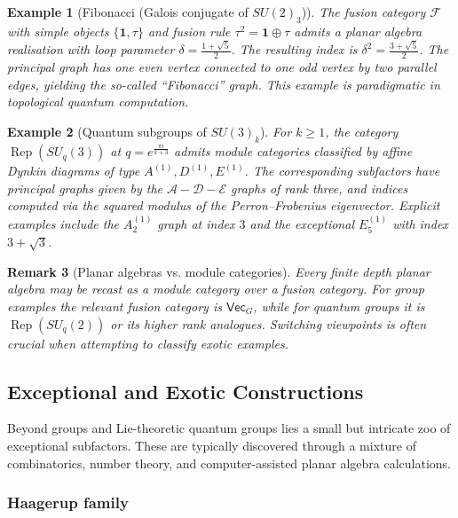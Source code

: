 \documentclass[11pt, a4paper]{article}
\theoremstyle{colored_def}
\theoremstyle{colored_thm}
\theoremstyle{colored_ex}
\newtheorem{example}{Example}[section]
\newtheorem{remark}[example]{Remark}
\begin{document}
\begin{example}[Fibonacci (Galois conjugate of $SU(2)_3$)]\label{ex:fibonacci}
The fusion category $\mathcal{F}$ with simple objects $\{\mathbf{1}, \tau\}$ and fusion rule $\tau^2 = \mathbf{1} \oplus \tau$ admits a planar algebra realisation with loop parameter $\delta = \frac{1 + \sqrt{5}}{2}$. The resulting index is $\delta^2 = \frac{3 + \sqrt{5}}{2}$. The principal graph has one even vertex connected to one odd vertex by two parallel edges, yielding the so-called ``Fibonacci'' graph. This example is paradigmatic in topological quantum computation.
\end{example}

\begin{example}[Quantum subgroups of $SU(3)_k$]\label{ex:su3}
For $k \geq 1$, the category $\operatorname{Rep}(SU_q(3))$ at $q = e^{\frac{\pi i}{k+3}}$ admits module categories classified by affine Dynkin diagrams of type $A^{(1)}, D^{(1)}, E^{(1)}$. The corresponding subfactors have principal graphs given by the $\mathcal{A}-\mathcal{D}-\mathcal{E}$ graphs of rank three, and indices computed via the squared modulus of the Perron--Frobenius eigenvector. Explicit examples include the $A^{(1)}_2$ graph at index $3$ and the exceptional $E^{(1)}_5$ with index $3 + \sqrt{3}$.
\end{example}

\begin{remark}[Planar algebras vs. module categories]
Every finite depth planar algebra may be recast as a module category over a fusion category. For group examples the relevant fusion category is $\mathsf{Vec}_G$, while for quantum groups it is $\operatorname{Rep}(SU_q(2))$ or its higher rank analogues. Switching viewpoints is often crucial when attempting to classify exotic examples.
\end{remark}

\subsection{Exceptional and Exotic Constructions}\label{subsec:exceptional}

Beyond groups and Lie-theoretic quantum groups lies a small but intricate zoo of exceptional subfactors. These are typically discovered through a mixture of combinatorics, number theory, and computer-assisted planar algebra calculations.

\subsubsection{Haagerup family}
\end{document}
